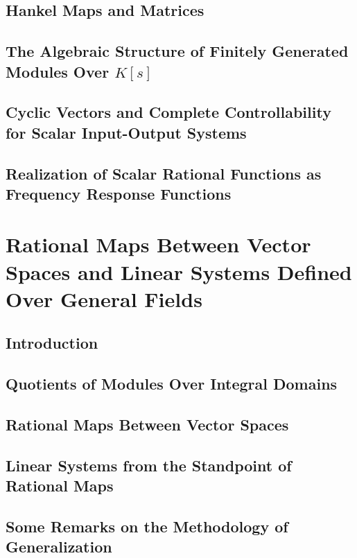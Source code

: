 \documentclass[12pt]{book}
\theoremstyle{plain}
\theoremstyle{definition}
\begin{document}
\section{Hankel Maps and Matrices}

\section{The Algebraic Structure of Finitely Generated Modules Over $K[s]$}

\section{Cyclic Vectors and Complete Controllability for Scalar Input-Output Systems}

\section{Realization of Scalar Rational Functions as Frequency Response Functions}

\chapter{Rational Maps Between Vector Spaces and Linear Systems Defined Over General Fields}

\section{Introduction}

\section{Quotients of Modules Over Integral Domains}

\section{Rational Maps Between Vector Spaces}

\section{Linear Systems from the Standpoint of Rational Maps}

\section{Some Remarks on the Methodology of Generalization}
\end{document}
